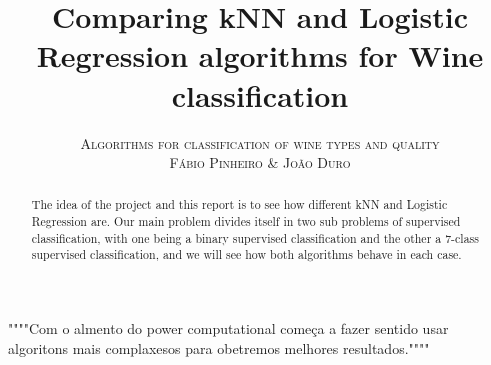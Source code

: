 \documentclass[twoside]{article}
\title{\vspace{-15mm}\fontsize{24pt}{10pt}\selectfont\textbf{Comparing kNN and Logistic Regression algorithms for Wine classification}}
\author{
\large
\textsc{Algorithms for classification of wine types and quality}\\[2mm]
\textsc{F\'{a}bio Pinheiro  \& Jo\~{a}o Duro}\\[2mm]
\vspace{-5mm}
}
\date{}
\begin{document}
\maketitle %


\begin{abstract}
The idea of the project and this report is to see how different kNN and Logistic Regression are. Our main problem divides itself in two sub problems of supervised classification, with one being a binary supervised classification and the other a 7-class supervised classification, and we will see how both algorithms behave in each case.


\end{abstract}
""""Com o almento do power computational começa a fazer sentido usar algoritons mais complaxesos para obetremos melhores resultados.""""

\end{document}
